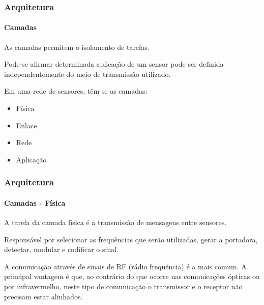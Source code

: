 \documentclass[notes]{beamer}
\begin{document}
\begin{frame}
\frametitle{Arquitetura}
\framesubtitle{Camadas}

\begin{block}

As camadas permitem o isolamento de tarefas.

\end{block} \pause

\begin{block}

Pode-se  afirmar determinada aplicação de um sensor pode ser definida independentemente do meio de transmissão utilizado.

\end{block} \pause

\begin{block}

Em uma rede de sensores, têm-se as camadas:

\begin{itemize}

\item Física \pause
\item Enlace \pause
\item Rede \pause
\item Aplicação

\end{itemize}

\end{block}

\end{frame}

\begin{frame}
\frametitle{Arquitetura}
\framesubtitle{Camadas - Física}

\begin{block}

A tarefa da camada física é a transmissão de mensagens entre sensores.

\end{block} \pause

\begin{block}

Responsável por selecionar as frequências que serão utilizadas, gerar a portadora, detectar, modular e codificar o sinal. 

\end{block} \pause

\begin{block}

A comunicação através de sinais de RF (rádio frequência) é a mais comum. A principal vantagem é que, ao contrário do que ocorre nas comunicações ópticas ou por infravermelho, neste tipo de comunicação o transmissor e o receptor não precisam estar alinhados.

\end{block}

\end{frame}
\end{document}
